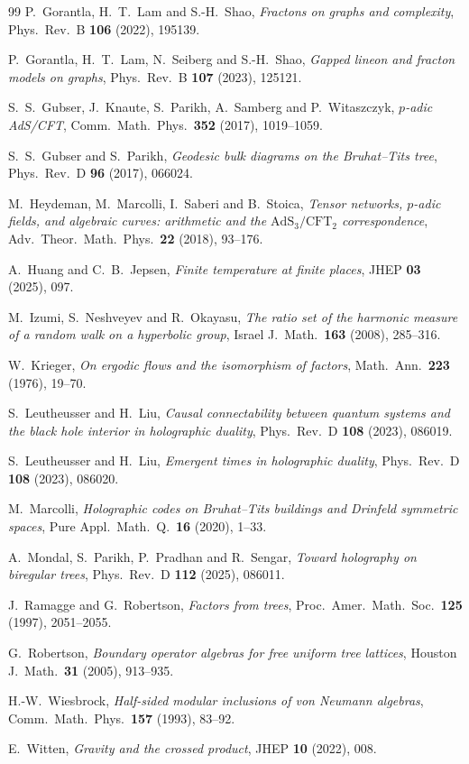 \documentclass[11pt]{article}
\theoremstyle{plain}
\theoremstyle{remark}
\begin{document}
\begin{thebibliography}{99}
 P.~Gorantla, H.~T.~Lam and S.-H.~Shao,
\emph{Fractons on graphs and complexity},
Phys.\ Rev.\ B \textbf{106} (2022), 195139.

 P.~Gorantla, H.~T.~Lam, N.~Seiberg and S.-H.~Shao,
\emph{Gapped lineon and fracton models on graphs},
Phys.\ Rev.\ B \textbf{107} (2023), 125121.

 S.~S.~Gubser, J.~Knaute, S.~Parikh, A.~Samberg and P.~Witaszczyk,
\emph{$p$-adic AdS/CFT},
Comm.\ Math.\ Phys.\ \textbf{352} (2017), 1019--1059.

 S.~S.~Gubser and S.~Parikh,
\emph{Geodesic bulk diagrams on the Bruhat--Tits tree},
Phys.\ Rev.\ D \textbf{96} (2017), 066024.

 M.~Heydeman, M.~Marcolli, I.~Saberi and B.~Stoica,
\emph{Tensor networks, $p$-adic fields, and algebraic curves: arithmetic and the
$\mathrm{AdS}_3/\mathrm{CFT}_2$ correspondence},
Adv.\ Theor.\ Math.\ Phys.\ \textbf{22} (2018), 93--176.

 A.~Huang and C.~B.~Jepsen,
\emph{Finite temperature at finite places},
JHEP \textbf{03} (2025), 097.

 M.~Izumi, S.~Neshveyev and R.~Okayasu,
\emph{The ratio set of the harmonic measure of a random walk on a hyperbolic group},
Israel J.\ Math.\ \textbf{163} (2008), 285--316.

 W.~Krieger,
\emph{On ergodic flows and the isomorphism of factors},
Math.\ Ann.\ \textbf{223} (1976), 19--70.

 S.~Leutheusser and H.~Liu,
\emph{Causal connectability between quantum systems and the black hole interior in
holographic duality}, Phys.\ Rev.\ D \textbf{108} (2023), 086019.

 S.~Leutheusser and H.~Liu,
\emph{Emergent times in holographic duality},
Phys.\ Rev.\ D \textbf{108} (2023), 086020.

 M.~Marcolli,
\emph{Holographic codes on Bruhat--Tits buildings and Drinfeld symmetric spaces},
Pure Appl.\ Math.\ Q.\ \textbf{16} (2020), 1--33.

 A.~Mondal, S.~Parikh, P.~Pradhan and R.~Sengar,
\emph{Toward holography on biregular trees},
Phys.\ Rev.\ D \textbf{112} (2025), 086011.

 J.~Ramagge and G.~Robertson,
\emph{Factors from trees},
Proc.\ Amer.\ Math.\ Soc.\ \textbf{125} (1997), 2051--2055.

 G.~Robertson,
\emph{Boundary operator algebras for free uniform tree lattices},
Houston J.\ Math.\ \textbf{31} (2005), 913--935.

 H.-W.~Wiesbrock,
\emph{Half-sided modular inclusions of von Neumann algebras},
Comm.\ Math.\ Phys.\ \textbf{157} (1993), 83--92.

 E.~Witten,
\emph{Gravity and the crossed product},
JHEP \textbf{10} (2022), 008.

\end{thebibliography}
\end{document}

